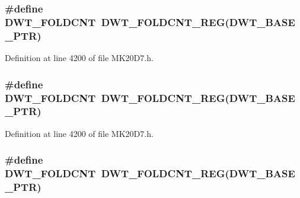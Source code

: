 \subsubsection[{\texorpdfstring{D\+W\+T\+\_\+\+F\+O\+L\+D\+C\+NT}{DWT_FOLDCNT}}]{\setlength{\rightskip}{0pt plus 5cm}\#define D\+W\+T\+\_\+\+F\+O\+L\+D\+C\+NT~{\bf D\+W\+T\+\_\+\+F\+O\+L\+D\+C\+N\+T\+\_\+\+R\+EG}({\bf D\+W\+T\+\_\+\+B\+A\+S\+E\+\_\+\+P\+TR})}\hypertarget{group___d_w_t___register___accessor___macros_ga2b741f598ca1e9c01acd2f063143e465}{}\label{group___d_w_t___register___accessor___macros_ga2b741f598ca1e9c01acd2f063143e465}


Definition at line 4200 of file M\+K20\+D7.\+h.

\subsubsection[{\texorpdfstring{D\+W\+T\+\_\+\+F\+O\+L\+D\+C\+NT}{DWT_FOLDCNT}}]{\setlength{\rightskip}{0pt plus 5cm}\#define D\+W\+T\+\_\+\+F\+O\+L\+D\+C\+NT~{\bf D\+W\+T\+\_\+\+F\+O\+L\+D\+C\+N\+T\+\_\+\+R\+EG}({\bf D\+W\+T\+\_\+\+B\+A\+S\+E\+\_\+\+P\+TR})}\hypertarget{group___d_w_t___register___accessor___macros_ga2b741f598ca1e9c01acd2f063143e465}{}\label{group___d_w_t___register___accessor___macros_ga2b741f598ca1e9c01acd2f063143e465}


Definition at line 4200 of file M\+K20\+D7.\+h.

\subsubsection[{\texorpdfstring{D\+W\+T\+\_\+\+F\+O\+L\+D\+C\+NT}{DWT_FOLDCNT}}]{\setlength{\rightskip}{0pt plus 5cm}\#define D\+W\+T\+\_\+\+F\+O\+L\+D\+C\+NT~{\bf D\+W\+T\+\_\+\+F\+O\+L\+D\+C\+N\+T\+\_\+\+R\+EG}({\bf D\+W\+T\+\_\+\+B\+A\+S\+E\+\_\+\+P\+TR})}\hypertarget{group___d_w_t___register___accessor___macros_ga2b741f598ca1e9c01acd2f063143e465}{}\label{group___d_w_t___register___accessor___macros_ga2b741f598ca1e9c01acd2f063143e465}


